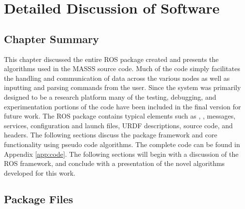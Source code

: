 \chapter{Detailed Discussion of Software}
\label{chap:code}
\section{Chapter Summary}
This chapter discussed the entire ROS package created and presents the algorithms used in the MASSS source code. Much of the code simply facilitates the handling and communication of data across the various nodes as well as inputting and parsing commands from the user. Since the system was primarily designed to be a research platform many of the testing, debugging, and experimentation portions of the code have been included in the final version for future work. The ROS package contains typical elements such as , , messages, services, configuration and launch files, URDF descriptions, source code, and headers. The following sections discuss the package framework and core functionality using pseudo code algorithms. The complete code can be found in Appendix \ref{app:code}. The following sections will begin with a discussion of the ROS framework, and conclude with a presentation of the novel algorithms developed for this work.\\
\section{Package Files}

